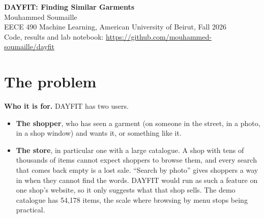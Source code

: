 \documentclass[11pt,a4paper]{article}
\begin{document}
\begin{center}
{\bfseries\fontsize{20}{24}\selectfont DAYFIT: Finding Similar Garments}\\[4pt]
{\normalsize Mouhammed Soumaille}\\[2pt]
{\normalsize EECE 490 Machine Learning, American University of Beirut, Fall 2026}\\[2pt]
{\small Code, results and lab notebook: \url{https://github.com/mouhammed-soumaille/dayfit}}
\end{center}

\begin{abstract}
\noindent Shoppers often see a garment they want but cannot describe it well enough to find it in an online
shop, and large shops lose those sales because text search and menus only work when the shopper can name what
they saw. DAYFIT lets the shopper search with the photo instead: it returns the five most similar items from
the shop's catalogue, labelled with the garment type and colour it measured. The search uses FashionSigLIP
image embeddings, fine-tuned on the catalogue with synthetic phone photos. On 481 held-out real street photos
(LookBench), the photo search puts the exact item first for 50\% of photos, four times as often as a
classical image search (12\%) and clearly ahead of a short typed search (31\%); only an idealised shopper who
types every attribute in the shop's own words matches it (49\%). Whether the shopper marks the garment or
sends the whole photo matters more than fine-tuning (50\% vs 39\%), while fine-tuning mainly buys robustness
to blur (+6 to +21 points). In a final test fixed in advance, on 83 photos of my own wardrobe, the system as
deployed returned the right kind of garment in its top 5 for 98.5\% of photos, but the exact article type
for only 75\%. A learned re-ranker and the system's ``not sure'' message did not work. The system runs as a
FastAPI service with a web page over a 54,178-item catalogue, answers in 266\,ms on a 4-core CPU and never
stores the photos.
\end{abstract}

\section{The problem}

\textbf{Who it is for.} DAYFIT has two users.
\begin{itemize}
\item \textbf{The shopper}, who has seen a garment (on someone in the street, in a photo, in a shop window)
  and wants it, or something like it.
\item \textbf{The store}, in particular one with a large catalogue. A shop with tens of thousands of items
  cannot expect shoppers to browse them, and every search that comes back empty is a lost sale. ``Search by
  photo'' gives shoppers a way in when they cannot find the words. DAYFIT would run as such a feature on one
  shop's website, so it only suggests what that shop sells. The demo catalogue has 54,178 items, the scale
  where browsing by menu stops being practical.
\end{itemize}
\end{document}
